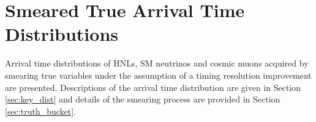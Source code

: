 
\chapter{Smeared True Arrival Time Distributions} 
\label{appendix_smeared}
\ifpdf
    \graphicspath{{Appendix6/Figs/Raster/}{Appendix6/Figs/PDF/}{Appendix6/Figs/}}
\else
    \graphicspath{{Appendix6/Figs/Vector/}{Appendix6/Figs/}}
\fi

Arrival time distributions of HNLs, SM neutrinos and cosmic muons acquired by smearing true variables under the assumption of a timing resolution improvement are presented.
Descriptions of the arrival time distribution are given in Section \ref{sec:key_dist} and details of the smearing process are provided in Section \ref{sec:truth_bucket}.

